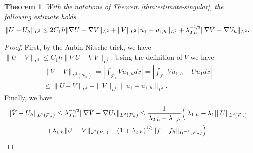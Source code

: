 \documentclass[JEP,XML,SOM,Unicode,ThmDefs,NoFloatCountersInSection,published]{cedram}
\theoremstyle{plain}
\newtheorem{thm}{Theorem}[section]
\theoremstyle{definition}
\newcommand{\lb}{\lambda}
\begin{document}
\begin{thm}\label{thm:estimate-singular-L2}
With the notations of Theorem \ref{thm:estimate-singular}, the following estimate holds
\[
\|U-U_{h}\|_{L^2}\le 2C_1h \|\nabla U-\nabla V\|_{L^2} + \|V\|_{L^2}\|u_1-u_{1,h}\|_{L^2}+ \lb_{2,h}^{-\sfrac 12} \| \nabla \tilde V-\nabla U_h\|_{L^2}.
\]
\end{thm}
\begin{proof}
First, by the Aubin-Nitsche trick, we have $\|U-V\|_{L^2}\le C_1h \|\nabla U-\nabla V\|_{L^2}$.
Using the definition of $\tilde V$ we have
\vspace*{-5pt}
\begin{multline*}
\|\tilde V-V\|_{L^2(\mathcal P_n)} = \left|\int_{\mathcal P_n} Vu_{1,h} dx\right| = \left|\int_{\mathcal P_n} Vu_{1,h}-U u_1 dx\right|\\
\le \|U-V\|_{L^2}+ \|V\|_{L^2}\|u_1-u_{1,h}\|_{L^2}.
\end{multline*}
Finally, we have
\vspace*{-5pt}
\begin{multline*} \|\tilde V-U_h\|_{L^2(\mathcal P_n)} \le \lb_{2,h}^{-\sfrac 12} \| \nabla \tilde V-\nabla U_h\|_{L^2(\mathcal P_n)}
\le \frac{1}{\lb_{2,h}-\lb_{1,h}} \Big (|\lb_{1,h}-\lb_1| \|U\|_{L^2(\mathcal P_n)}\\
+ \lb_{1,h}\|U-V\|_{L^2(\mathcal P_n)}+ (1+ \lb_{2,h})^{\sfrac 12}\|f-f_h\|_{H^{-1} (\mathcal P_n)}\Big).\qedhere
\end{multline*}
\end{proof}
\end{document}
